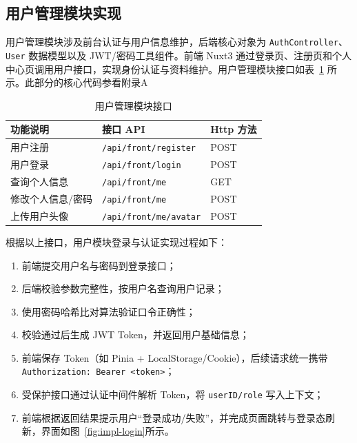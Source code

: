\documentclass[twoside]{thesis-cls-Miya} %
\begin{document}
\subsection{用户管理模块实现}

用户管理模块涉及前台认证与用户信息维护，后端核心对象为 \texttt{AuthController}、\texttt{User} 数据模型以及 JWT/密码工具组件。前端 Nuxt3 通过登录页、注册页和个人中心页调用用户接口，实现身份认证与资料维护。用户管理模块接口如表~\ref{tab:api-user} 所示。此部分的核心代码参看附录A 

\begin{table}[H]
	\centering
	\caption{用户管理模块接口}
	\label{tab:api-user}
	\renewcommand{\arraystretch}{1.25}
	\setlength{\tabcolsep}{0.2ex}
	\begin{tabularx}{\textwidth}{@{}>{\raggedright\arraybackslash}p{} >{\raggedright\arraybackslash}X >{\centering\arraybackslash}p{}@{}}
		\toprule
		功能说明 & 接口 API & Http 方法 \\
		\midrule
		用户注册 & \texttt{/api/front/register} & POST \\
		用户登录 & \texttt{/api/front/login} & POST \\
		查询个人信息 & \texttt{/api/front/me} & GET \\
		修改个人信息/密码 & \texttt{/api/front/me} & POST \\
		上传用户头像 & \texttt{/api/front/me/avatar} & POST \\
		\bottomrule
	\end{tabularx}
\end{table}

根据以上接口，用户模块登录与认证实现过程如下：
\begin{enumerate}[label=(\arabic*)]
	\item 前端提交用户名与密码到登录接口；
	\item 后端校验参数完整性，按用户名查询用户记录；
	\item 使用密码哈希比对算法验证口令正确性；
	\item 校验通过后生成 JWT Token，并返回用户基础信息；
	\item 前端保存 Token（如 Pinia + LocalStorage/Cookie），后续请求统一携带 \texttt{Authorization: Bearer \textless token\textgreater}；
	\item 受保护接口通过认证中间件解析 Token，将 \texttt{userID/role} 写入上下文；
	\item 前端根据返回结果提示用户“登录成功/失败”，并完成页面跳转与登录态刷新，界面如图~\ref{fig:impl-login}所示。
\end{enumerate}
\end{document}

